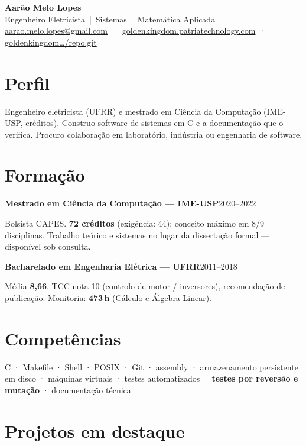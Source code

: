 \documentclass[10pt,a4paper]{article}
\newcommand{\lin}[2]{\noindent\textbf{#1}\hfill{\color{cinza}\small #2}\par}
\begin{document}

\begin{center}
{\LARGE\bfseries Aarão Melo Lopes}\\[1pt]
{\color{cinza}\small Engenheiro Eletricista \,|\, Sistemas \,|\, Matemática Aplicada}\\[1pt]
{\footnotesize
\href{mailto:aarao.melo.lopes@gmail.com}{aarao.melo.lopes@gmail.com}
\,·\,
\href{https://goldenkingdom.patriatechnology.com}{goldenkingdom.patriatechnology.com}
\,·\,
\href{https://goldenkingdom.patriatechnology.com/repo.git}{goldenkingdom\ldots/repo.git}}
\end{center}

\section*{Perfil}

Engenheiro eletricista (UFRR) e mestrado em Ciência da Computação (IME-USP, créditos).
Construo software de sistemas em C e a documentação que o verifica.
Procuro colaboração em laboratório, indústria ou engenharia de software.

\section*{Formação}

\lin{Mestrado em Ciência da Computação --- IME-USP}{2020--2022}
Bolsista CAPES. \textbf{72 créditos} (exigência: 44); conceito máximo em 8/9 disciplinas.
Trabalho teórico e sistemas no lugar da dissertação formal --- disponível sob consulta.

\smallskip
\lin{Bacharelado em Engenharia Elétrica --- UFRR}{2011--2018}
Média \textbf{8{,}66}. TCC nota 10 (controlo de motor / inversores), recomendação de publicação.
Monitoria: \textbf{473\,h} (Cálculo e Álgebra Linear).

\section*{Competências}

{\small C · Makefile · Shell · POSIX · Git · assembly ·
armazenamento persistente em disco · máquinas virtuais ·
testes automatizados · \textbf{testes por reversão e mutação} · documentação técnica}

\section*{Projetos em destaque}
\end{document}
